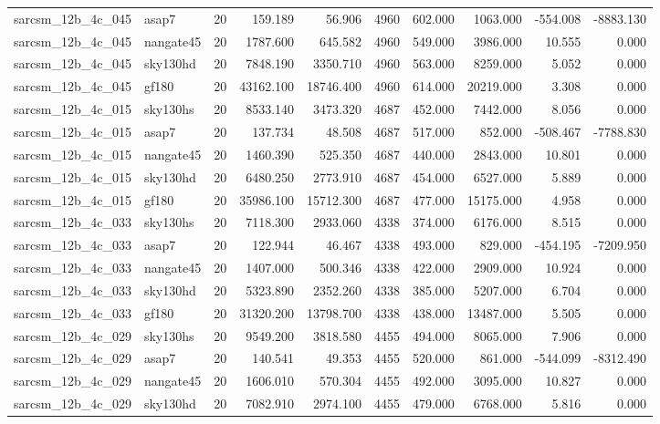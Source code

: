 \begin{longtable}{llrrrrrrrr}
sarcsm\_12b\_4c\_045 & asap7 & 20 & 159.189 & 56.906 & 4960 & 602.000 & 1063.000 & -554.008 & -8883.130 \\
sarcsm\_12b\_4c\_045 & nangate45 & 20 & 1787.600 & 645.582 & 4960 & 549.000 & 3986.000 & 10.555 & 0.000 \\
sarcsm\_12b\_4c\_045 & sky130hd & 20 & 7848.190 & 3350.710 & 4960 & 563.000 & 8259.000 & 5.052 & 0.000 \\
sarcsm\_12b\_4c\_045 & gf180 & 20 & 43162.100 & 18746.400 & 4960 & 614.000 & 20219.000 & 3.308 & 0.000 \\
sarcsm\_12b\_4c\_015 & sky130hs & 20 & 8533.140 & 3473.320 & 4687 & 452.000 & 7442.000 & 8.056 & 0.000 \\
sarcsm\_12b\_4c\_015 & asap7 & 20 & 137.734 & 48.508 & 4687 & 517.000 & 852.000 & -508.467 & -7788.830 \\
sarcsm\_12b\_4c\_015 & nangate45 & 20 & 1460.390 & 525.350 & 4687 & 440.000 & 2843.000 & 10.801 & 0.000 \\
sarcsm\_12b\_4c\_015 & sky130hd & 20 & 6480.250 & 2773.910 & 4687 & 454.000 & 6527.000 & 5.889 & 0.000 \\
sarcsm\_12b\_4c\_015 & gf180 & 20 & 35986.100 & 15712.300 & 4687 & 477.000 & 15175.000 & 4.958 & 0.000 \\
sarcsm\_12b\_4c\_033 & sky130hs & 20 & 7118.300 & 2933.060 & 4338 & 374.000 & 6176.000 & 8.515 & 0.000 \\
sarcsm\_12b\_4c\_033 & asap7 & 20 & 122.944 & 46.467 & 4338 & 493.000 & 829.000 & -454.195 & -7209.950 \\
sarcsm\_12b\_4c\_033 & nangate45 & 20 & 1407.000 & 500.346 & 4338 & 422.000 & 2909.000 & 10.924 & 0.000 \\
sarcsm\_12b\_4c\_033 & sky130hd & 20 & 5323.890 & 2352.260 & 4338 & 385.000 & 5207.000 & 6.704 & 0.000 \\
sarcsm\_12b\_4c\_033 & gf180 & 20 & 31320.200 & 13798.700 & 4338 & 438.000 & 13487.000 & 5.505 & 0.000 \\
sarcsm\_12b\_4c\_029 & sky130hs & 20 & 9549.200 & 3818.580 & 4455 & 494.000 & 8065.000 & 7.906 & 0.000 \\
sarcsm\_12b\_4c\_029 & asap7 & 20 & 140.541 & 49.353 & 4455 & 520.000 & 861.000 & -544.099 & -8312.490 \\
sarcsm\_12b\_4c\_029 & nangate45 & 20 & 1606.010 & 570.304 & 4455 & 492.000 & 3095.000 & 10.827 & 0.000 \\
sarcsm\_12b\_4c\_029 & sky130hd & 20 & 7082.910 & 2974.100 & 4455 & 479.000 & 6768.000 & 5.816 & 0.000 \\

\end{longtable}
